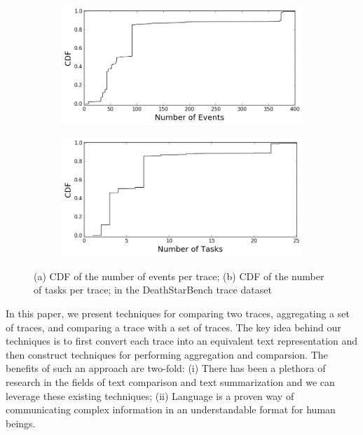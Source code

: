 \begin{figure}
    \centering%
    \begin{subfigure}{0.5\textwidth}%
        \includegraphics[width=\linewidth]{"fig/events_cdf"}%
        \caption{}%
    \end{subfigure}%
    \begin{subfigure}{0.5\textwidth}%
        \includegraphics[width=\linewidth]{"fig/tasks_cdf"}%
        \caption{}%
    \end{subfigure}%
    \caption{(a) CDF of the number of events per trace; (b) CDF of the number of tasks per trace; in the DeathStarBench trace dataset}%
    \label{fig:dataset_cdf}%
\end{figure}

In this paper, we present techniques for comparing two traces, aggregating a set of traces, and comparing
a trace with a set of traces. The key idea behind our techniques is to first convert each trace into
an equivalent text representation and then construct techniques for performing aggregation and comparsion.
The benefits of such an approach are two-fold: (i) There has been a plethora of research in the fields
of text comparison and text summarization and we can leverage these existing techniques; (ii) Language
is a proven way of communicating complex information in an understandable format for human beings.

